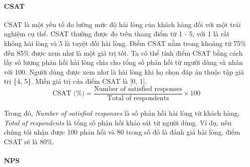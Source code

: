 \paragraph{CSAT}\mbox{}

CSAT là một yếu tố đo lường mức độ hài lòng của khách hàng đối với một trải nghiệm cụ thể. CSAT thường được đo trên thang điểm từ 1 - 5, với 1 là rất không hài lòng và 5 là tuyệt đối hài lòng. Điểm CSAT nằm trong khoảng từ 75\% đến 85\% được xem như là một giá trị tốt. Ta có thể tính điểm CSAT bằng cách lấy số lượng phản hồi hài lòng chia cho tổng số phản hồi từ người dùng và nhân với 100. Người dùng được xem như là hài lòng khi họ chọn đáp án thuộc tập giá trị \{4, 5\}. Miền giá trị của điểm CSAT là [0, 1].
\[ \text{CSAT (\%)} = \frac{\text{Number of satisfied responses}}{\text{Total of respondents}} \times 100 \]
\par
Trong đó, \emph{Number of satisfied responses} là số phản hồi hài lòng từ khách hàng, \emph{Total of respondents} là tổng số phản hồi khảo sát từ người dùng. Ví dụ, nếu chúng tôi nhận được 100 phản hồi và 80 trong số đó là đánh giá hài lòng, điểm CSAT sẽ là 80\%.

\paragraph{NPS}\mbox{}

